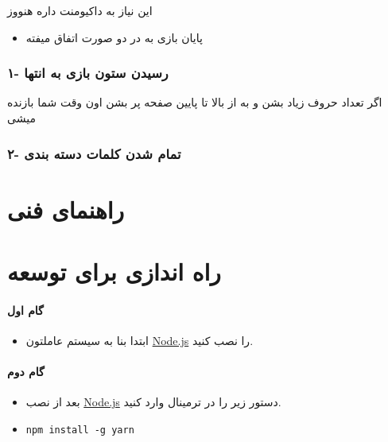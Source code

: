\documentclass[]{article}
\providecommand{\tightlist}{%
  \setlength{\itemsep}{0pt}\setlength{\parskip}{0pt}}
\let\oldparagraph\paragraph
\renewcommand{\paragraph}[1]{\oldparagraph{#1}\mbox{}}
\begin{document}
این نیاز به داکیومنت داره هنووز

\begin{itemize}
\tightlist
\item
  پایان بازی به در دو صورت اتفاق میفته
\end{itemize}

\subsubsection{۱- رسیدن ستون بازی به
انتها}\label{ux631ux633ux6ccux62fux646-ux633ux62aux648ux646-ux628ux627ux632ux6cc-ux628ux647-ux627ux646ux62aux647ux627}

اگر تعداد حروف زیاد بشن و به از بالا تا پایین صفحه پر بشن اون وقت شما
بازنده میشی

\subsubsection{۲- تمام شدن کلمات دسته
بندی}\label{ux62aux645ux627ux645-ux634ux62fux646-ux6a9ux644ux645ux627ux62a-ux62fux633ux62aux647-ux628ux646ux62fux6cc}

\section{راهنمای
فنی}\label{ux631ux627ux647ux646ux645ux627ux6cc-ux641ux646ux6cc}

\section{راه اندازی برای
توسعه}\label{ux631ux627ux647-ux627ux646ux62fux627ux632ux6cc-ux628ux631ux627ux6cc-ux62aux648ux633ux639ux647}

\paragraph{گام اول}\label{ux6afux627ux645-ux627ux648ux644}

\begin{itemize}
\tightlist
\item
  ابتدا بنا به سیستم عاملتون \href{https://nodejs.org/en/}{Node.js} را
  نصب کنید.
\end{itemize}

\paragraph{گام دوم}\label{ux6afux627ux645-ux62fux648ux645}

\begin{itemize}
\tightlist
\item
  بعد از نصب \href{https://nodejs.org/en/}{Node.js} دستور زیر را در
  ترمینال وارد کنید.
\item
  \texttt{npm\ install\ -g\ yarn}
\end{itemize}
\end{document}
